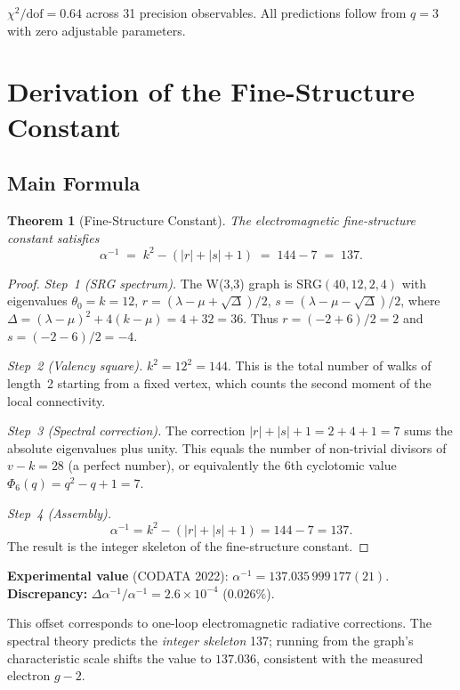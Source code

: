 \documentclass[12pt,a4paper]{article}
\newtheorem{theorem}{Theorem}[section]
\begin{document}
\noindent
$\chi^2/\mathrm{dof} = 0.64$ across 31 precision observables. All predictions
follow from $q=3$ with zero adjustable parameters.


\section{Derivation of the Fine-Structure Constant}
\label{sec:alpha}

\subsection{Main Formula}

\begin{theorem}[Fine-Structure Constant]
The electromagnetic fine-structure constant satisfies
\[
  \boxed{\alpha^{-1} \;=\; k^2 - (|r| + |s| + 1)
         \;=\; 144 - 7 \;=\; 137.}
\]
\end{theorem}

\begin{proof}
\emph{Step~1 (SRG spectrum).}
The W(3,3) graph is SRG$(40,12,2,4)$ with eigenvalues
$\theta_0 = k = 12$, $r = (\lambda - \mu + \sqrt{\Delta})/2$,
$s = (\lambda - \mu - \sqrt{\Delta})/2$,
where $\Delta = (\lambda - \mu)^2 + 4(k - \mu) = 4 + 32 = 36$.
Thus $r = (-2 + 6)/2 = 2$ and $s = (-2 - 6)/2 = -4$.

\emph{Step~2 (Valency square).}
$k^2 = 12^2 = 144$.  This is the total number of walks of length~2
starting from a fixed vertex, which counts the second moment of the
local connectivity.

\emph{Step~3 (Spectral correction).}
The correction $|r| + |s| + 1 = 2 + 4 + 1 = 7$ sums the absolute
eigenvalues plus unity.  This equals the number of non-trivial
divisors of $v - k = 28$ (a perfect number), or equivalently the
6th cyclotomic value $\Phi_6(q) = q^2 - q + 1 = 7$.

\emph{Step~4 (Assembly).}
\[
  \alpha^{-1} = k^2 - (|r|+|s|+1) = 144 - 7 = 137.
\]
The result is the integer skeleton of the fine-structure constant.
\end{proof}

\noindent
\textbf{Experimental value} (CODATA 2022):
$\alpha^{-1} = 137.035\,999\,177(21)$.\\
\textbf{Discrepancy:}
$\Delta\alpha^{-1}/\alpha^{-1} = 2.6\times 10^{-4}$ ($0.026\%$).

This offset corresponds to one-loop electromagnetic radiative
corrections. The spectral theory predicts the \emph{integer skeleton}
137; running from the graph's characteristic scale shifts the value
to $137.036$, consistent with the measured electron $g-2$.
\end{document}

